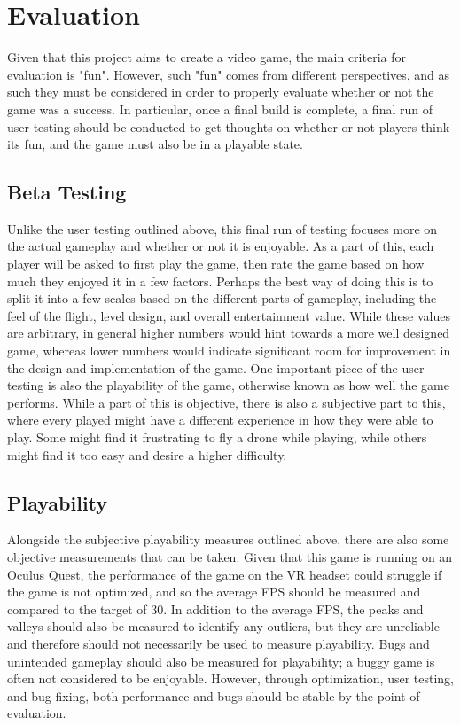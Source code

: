 \documentclass[10pt,twocolumn]{article}
\begin{document}
\section{Evaluation}

Given that this project aims to create a video game, the main criteria for evaluation is "fun". However, such "fun" comes from different perspectives, and as such they must be considered in order to properly evaluate whether or not the game was a success. In particular, once a final build is complete, a final run of user testing should be conducted to get thoughts on whether or not players think its fun, and the game must also be in a playable state.

\subsection{Beta Testing}
Unlike the user testing outlined above, this final run of testing focuses more on the actual gameplay and whether or not it is enjoyable. As a part of this, each player will be asked to first play the game, then rate the game based on how much they enjoyed it in a few factors. Perhaps the best way of doing this is to split it into a few scales based on the different parts of gameplay, including the feel of the flight, level design, and overall entertainment value. While these values are arbitrary, in general higher numbers would hint towards a more well designed game, whereas lower numbers would indicate significant room for improvement in the design and implementation of the game. One important piece of the user testing is also the playability of the game, otherwise known as how well the game performs. While a part of this is objective, there is also a subjective part to this, where every played might have a different experience in how they were able to play. Some might find it frustrating to fly a drone while playing, while others might find it too easy and desire a higher difficulty.

\subsection{Playability}
Alongside the subjective playability measures outlined above, there are also some objective measurements that can be taken. Given that this game is running on an Oculus Quest, the performance of the game on the VR headset could struggle if the game is not optimized, and so the average FPS should be measured and compared to the target of 30. In addition to the average FPS, the peaks and valleys should also be measured to identify any outliers, but they are unreliable and therefore should not necessarily be used to measure playability. Bugs and unintended gameplay should also be measured for playability; a buggy game is often not considered to be enjoyable. However, through optimization, user testing, and bug-fixing, both performance and bugs should be stable by the point of evaluation.
\end{document}

